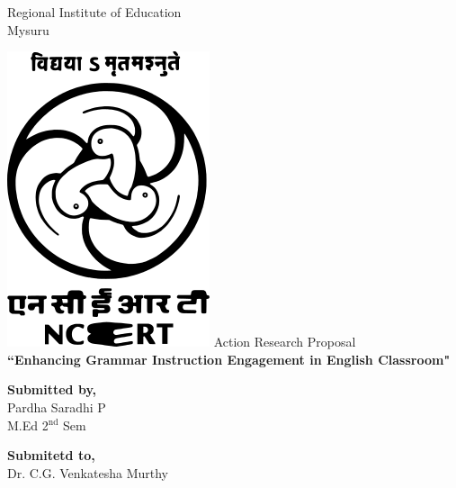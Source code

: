 \thispagestyle{empty}
\begin{center}
   \huge{Regional Institute of Education} \\

    
\huge{Mysuru}

\vfill
\includegraphics[scale=0.5]{NCERT.png}
\vfill
\LARGE{Action Research Proposal}
\\

\Huge{ \textbf{``Enhancing Grammar Instruction Engagement in English Classroom"}}\\
\vfill


\large
\textbf{Submitted by,}\\
    Pardha Saradhi P\\
    M.Ed 2$^{\text{nd}}$ Sem

\vfill
\textbf{Submitetd to,}\\
Dr. C.G. Venkatesha Murthy\\
\vfill
\normalsize
\end{center}
